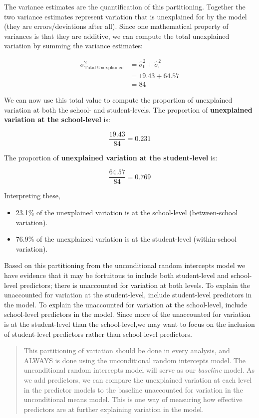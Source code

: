 \documentclass[]{book}
\providecommand{\tightlist}{%
  \setlength{\itemsep}{0pt}\setlength{\parskip}{0pt}}
\begin{document}
The variance estimates are the quantification of this partitioning. Together the two variance estimates represent variation that is unexplained for by the model (they are errors/deviations after all). Since one mathematical property of variances is that they are additive, we can compute the total unexplained variation by summing the variance estimates:

\[
\begin{split}
\sigma^2_{\mathrm{Total~Unexplained}} &= \hat\sigma^2_0 + \hat\sigma^2_{\epsilon}\\[1em]
&= 19.43 + 64.57 \\[1em]
&= 84
\end{split}
\]

We can now use this total value to compute the proportion of unexplained variation at both the school- and student-levels. The proportion of \textbf{unexplained variation at the school-level} is:

\[
\frac{19.43}{84} = 0.231
\]

The proportion of \textbf{unexplained variation at the student-level} is:

\[
\frac{64.57}{84} = 0.769
\]

Interpreting these,

\begin{itemize}
\tightlist
\item
  23.1\% of the unexplained variation is at the school-level (between-school variation).
\item
  76.9\% of the unexplained variation is at the student-level (within-school variation).
\end{itemize}

Based on this partitioning from the unconditional random intercepts model we have evidence that it may be fortuitous to include both student-level and school-level predictors; there is unaccounted for variation at both levels. To explain the unaccounted for variation at the student-level, include student-level predictors in the model. To explain the unaccounted for variation at the school-level, include school-level predictors in the model. Since more of the unaccounted for variation is at the student-level than the school-level,we may want to focus on the inclusion of student-level predictors rather than school-level predictors.

\begin{quote}
This partitioning of variation should be done in every analysis, and ALWAYS is done using the unconditional random intercepts model. The unconditional random intercepts model will serve as our \emph{baseline} model. As we add predictors, we can compare the unexplained variation at each level in the predictor models to the baseline unaccounted for variation in the unconditional means model. This is one way of measuring how effective predictors are at further explaining variation in the model.
\end{quote}
\end{document}
